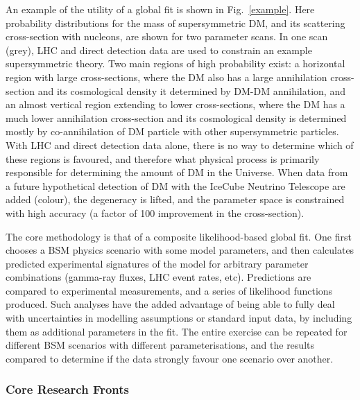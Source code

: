 \documentclass[10pt,oneside,twocolumn,a4paper]{article}
\begin{document}
An example of the utility of a global fit is shown in Fig.~\ref{example}.  Here probability distributions for the mass of supersymmetric DM, and its scattering cross-section with nucleons, are shown for two parameter scans.  In one scan (grey), LHC and direct detection data are used to constrain an example supersymmetric theory.  Two main regions of high probability exist: a horizontal region with large cross-sections, where the DM also has a large annihilation cross-section and its cosmological density it determined by DM-DM annihilation, and an almost vertical region extending to lower cross-sections, where the DM has a much lower annihilation cross-section and its cosmological density is determined mostly by co-annihilation of DM particle with other supersymmetric particles.  With LHC and direct detection data alone, there is no way to determine which of these regions is favoured, and therefore what physical process is primarily responsible for determining the amount of DM in the Universe.  When data from a future hypothetical detection of DM with the IceCube Neutrino Telescope are added (colour), the degeneracy is lifted, and the parameter space is constrained with high accuracy (a factor of 100 improvement in the cross-section).

The core methodology is that of a composite likelihood-based global fit.  One first chooses a BSM physics scenario with some model parameters, and then calculates predicted experimental signatures of the model for arbitrary parameter combinations (gamma-ray fluxes, LHC event rates, etc).  Predictions are compared to experimental measurements, and a series of likelihood functions produced.  Such analyses have the added advantage of being able to fully deal with uncertainties in modelling assumptions or standard input data, by including them as additional parameters in the fit.  The entire exercise can be repeated for different BSM scenarios with different parameterisations, and the results compared to determine if the data strongly favour one scenario over another.

\subsubsection*{Core Research Fronts}
\end{document}
